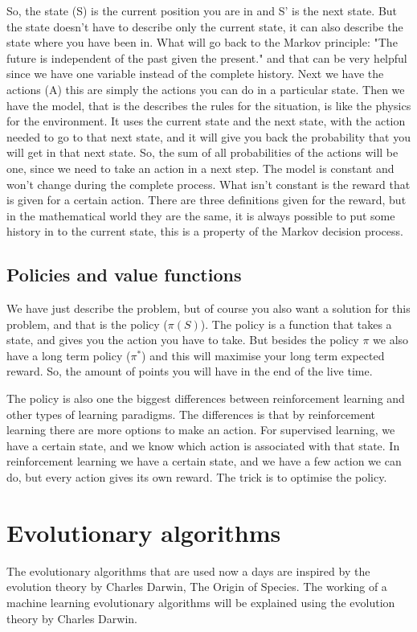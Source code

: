 \documentclass{report}
\begin{document}
So, the state (S) is the current position you are in and S' is the next state. But the state doesn't have to describe only the current state, it can also describe the state where you have been in. What will go back to the Markov principle: "The future is independent of the past given the present." and that can be very helpful since we have one variable instead of the complete history. Next we have the actions (A) this are simply the actions you can do in a particular state. Then we have the model, that is the describes the rules for the situation, is like the physics for the environment. It uses the current state and the next state, with the action needed to go to that next state, and it will give you back the probability that you will get in that next state. So, the sum of all probabilities of the actions will be one, since we need to take an action in a next step. The model is constant and won't change during the complete process. What isn't constant is the reward that is given for a certain action. There are three definitions given for the reward, but in the mathematical world they are the same, it is always possible to put some history in to the current state, this is a property of the Markov decision process.

\subsection{Policies and value functions}
We have just describe the problem, but of course you also want a solution for this problem, and that is the policy ($\pi(S)$). The policy is a function that takes a state, and gives you the action you have to take. But besides the policy $\pi$ we also have a long term policy ($\pi^*$) and this will maximise your long term expected reward. So, the amount of points you will have in the end of the live time.

The policy is also one the biggest differences between reinforcement learning and other types of learning paradigms. The differences is that by reinforcement learning there are more options to make an action. For supervised learning, we have a certain state, and we know which action is associated with that state. In reinforcement learning we have a certain state, and we have a few action we can do, but every action gives its own reward. The trick is to optimise the policy.

\section{Evolutionary algorithms}
The evolutionary algorithms that are used now a days are inspired by the evolution theory by Charles Darwin\cite{RL_EA}, The Origin of Species. The working of a machine learning evolutionary algorithms will be explained using the evolution theory by Charles Darwin.
\end{document}
